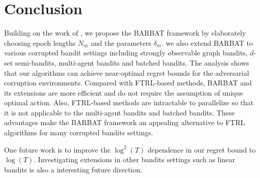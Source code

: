 \section{Conclusion}
\label{sec:con}
Building on the work of \citet{gupta2019better}, we propose the BARBAT framework by elaborately choosing epoch lengths $N_m$ and the parameters $\delta_m$. we also extend BARBAT to various corrupted bandit settings including strongly observable graph bandits, $d$-set semi-bandits, multi-agent bandits and batched bandits. The analysis shows that our algorithms can achieve near-optimal regret bounds for the adversarial corruption environments. Compared with FTRL-based methods, BARBAT and its extensions are more efficient and do not require the assumption of unique optimal action. Also, FTRL-based methods are intractable to parallelize so that it is not applicable to the multi-agent bandits and batched bandits. These advantages make the BARBAT framework an appealing alternative to FTRL algorithms for many corrupted bandits settings.

One future work is to improve the $\log^2(T)$ dependence in our regret bound to $\log(T)$. Investigating extensions in other bandits settings such as linear bandits is also a interesting future direction.
